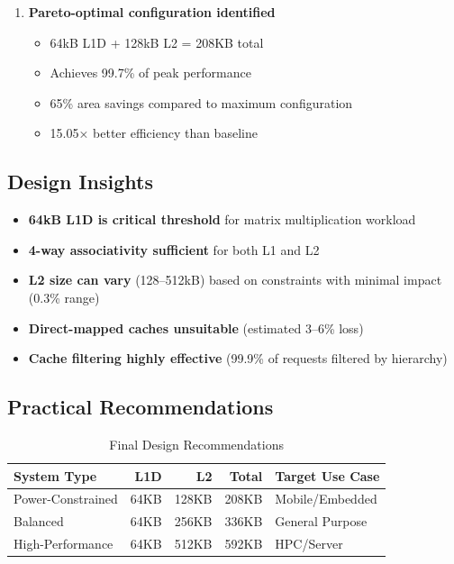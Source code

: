 \documentclass[11pt,a4paper]{article}
\begin{document}
\begin{enumerate}[noitemsep]
    \item \textbf{Pareto-optimal configuration identified}
    \begin{itemize}[noitemsep]
        \item 64kB L1D + 128kB L2 = 208KB total
        \item Achieves 99.7\% of peak performance
        \item 65\% area savings compared to maximum configuration
        \item 15.05× better efficiency than baseline
    \end{itemize}
\end{enumerate}

\subsection{Design Insights}

\begin{itemize}[noitemsep]
    \item \textbf{64kB L1D is critical threshold} for matrix multiplication workload
    \item \textbf{4-way associativity sufficient} for both L1 and L2
    \item \textbf{L2 size can vary} (128--512kB) based on constraints with minimal impact (0.3\% range)
    \item \textbf{Direct-mapped caches unsuitable} (estimated 3--6\% loss)
    \item \textbf{Cache filtering highly effective} (99.9\% of requests filtered by hierarchy)
\end{itemize}

\subsection{Practical Recommendations}

\begin{table}[H]
\centering
\caption{Final Design Recommendations}
\begin{tabular}{lrrrl}
\toprule
\textbf{System Type} & \textbf{L1D} & \textbf{L2} & \textbf{Total} & \textbf{Target Use Case} \\
\midrule
Power-Constrained & 64KB & 128KB & 208KB & Mobile/Embedded \\
Balanced & 64KB & 256KB & 336KB & General Purpose \\
High-Performance & 64KB & 512KB & 592KB & HPC/Server \\
\bottomrule
\end{tabular}
\end{table}
\end{document}
